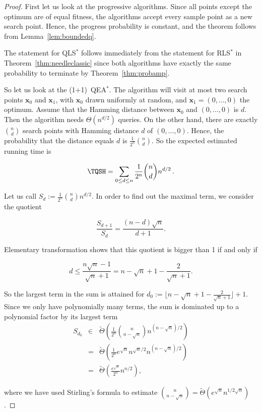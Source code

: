 \begin{proof}
First let us look at the progressive algorithms. Since all points except the optimum are of equal fitness, the algorithms accept every sample point as a new search point. Hence, the progress probability is constant, and the theorem follows from Lemma~\ref{lem:boundedq}.

The statement for QLS$^*$ follows immediately from the statement for RLS$^*$ in Theorem~\ref{thm:needleclassic} since both algorithms have exactly the same probability to terminate by Theorem~\ref{thm:probamp}.

So let us look at the (1+1)~QEA$^*$. The algorithm will visit at most two search points $\mathbf{x}_0$ and $\mathbf{x}_1$, with $\mathbf{x}_0$ drawn uniformly at random, and $\mathbf{x}_1 = (0,\ldots,0)$ the optimum. Assume that the Hamming distance between $\mathbf{x}_0$ and $(0,\ldots,0)$ is $d$. Then the algorithm needs $\Theta(n^{d/2})$ queries. On the other hand, there are exactly $\binom{n}{d}$ search points with Hamming distance $d$ of $(0,\ldots,0)$. Hence, the probability that the distance equals $d$ is $\frac{1}{2^n}\binom{n}{d}$. So the expected estimated running time is

\[
\TQSH=\sum_{0 \le d\le n}\frac{1}{2^n}\binom{n}{d}n^{d/2}\,.
\]

Let us call $S_d := \frac{1}{2^n}\binom{n}{d}n^{d/2}$. In order to find out the maximal term, we consider the quotient

\[
\frac{S_{d+1}}{S_d} = \frac{(n-d)\sqrt{n}}{d+1}.
\]

Elementary transformation shows that this quotient is bigger than 1 if and only if

\[
d \le \frac{n\sqrt{n}-1}{\sqrt{n}+1} = n-\sqrt{n}+1-\frac{2}{\sqrt{n}+1}.
\]

So the largest term in the sum is attained for $d_0 := \lfloor n-\sqrt{n}+1-\frac{2}{\sqrt{n}+1} \rfloor +1$. Since we only have polynomially many terms, the sum is dominated up to a polynomial factor by its largest term 
\begin{align*}
S_{d_0} & \in & \tilde{\Theta}\left(\frac{1}{2^n}\binom{n}{n-\sqrt{n}}n^{(n-\sqrt{n})/2}\right) \\
& = & \tilde{\Theta}\left(\frac{1}{2^n}e^{\sqrt{n}}n^{\sqrt{n}/2}n^{(n-\sqrt{n})/2}\right) \\
& = & \tilde{\Theta}\left(\frac{e^{\sqrt{n}}}{2^n}n^{n/2}\right),
\end{align*}

where we have used Stirling's formula to estimate $\binom{n}{n-\sqrt{n}} = \tilde{\Theta}(e^{\sqrt{n}}n^{1/2\sqrt{n}})$.

\end{proof}
